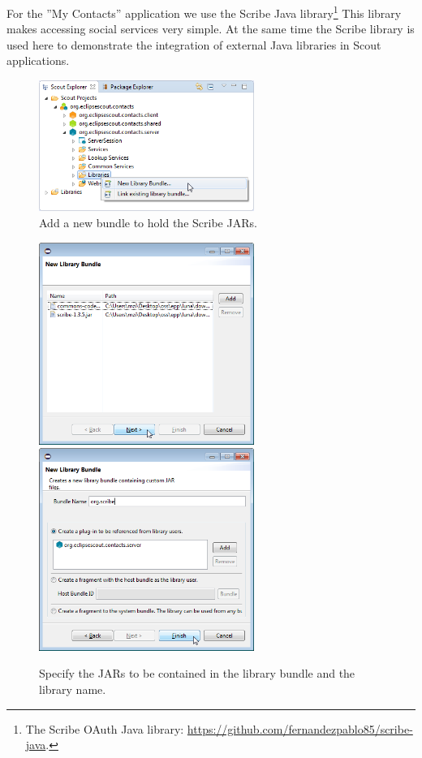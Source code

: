 \documentclass[a4paper,10pt,twoside]{book}
\begin{document}
For the ''My Contacts'' application we use the Scribe Java library\footnote{
The Scribe OAuth Java library: \url{https://github.com/fernandezpablo85/scribe-java}.
}
This library makes accessing social services very simple.
At the same time the Scribe library is used here to demonstrate the integration of external Java libraries in Scout applications. 

\begin{figure}
\includegraphics[width=7cm]{new_library_scribe_contextmenu.png} \hspace{5mm}
\caption{Add a new bundle to hold the Scribe JARs.}
\end{figure}

\begin{figure}
\includegraphics[width=7cm]{new_library_scribe_1.png} \hspace{5mm}
\includegraphics[width=7cm]{new_library_scribe_2.png}
\caption{Specify the JARs to be contained in the library bundle and the library name.}
\end{figure}
\end{document}
